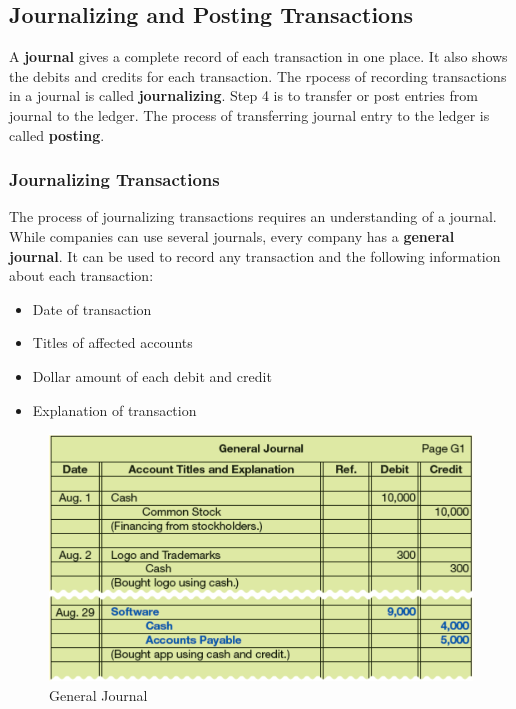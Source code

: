 \documentclass[../main.tex]{subfiles}
\begin{document}
	\subsection{Journalizing and Posting Transactions}
	
	A \textbf{journal} gives a complete record of each transaction in one 
	place. It also shows the debits and credits for each transaction. The 
	rpocess of recording transactions in a journal is called 
	\textbf{journalizing}. Step 4 is to transfer or post entries from journal 
	to the ledger. The process of transferring journal entry to the ledger is 
	called \textbf{posting}.
	
	\subsubsection{Journalizing Transactions} The process of journalizing 
	transactions requires an understanding of a journal. While companies can 
	use several journals, every company has a \textbf{general journal}. It can 
	be used to record any transaction and the following information about each 
	transaction:
	\begin{itemize}[noitemsep]
		\item Date of transaction
		\item Titles of affected accounts
		\item Dollar amount of each debit and credit
		\item Explanation of transaction
	\end{itemize}

	\begin{figure}[ht]
		\centering
		\includegraphics[width=1\columnwidth]{images/c2/general_journal.png}
		\caption{General Journal}
	\end{figure}
	
\end{document}

